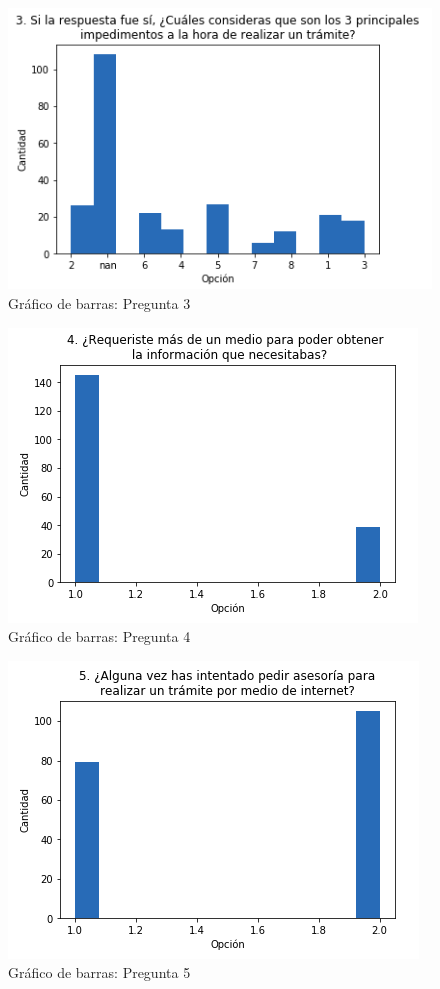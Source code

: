            \begin{figure}[H]
                \centering
                \includegraphics[width=.8\linewidth]{Latex/Classes/Imagenes/3.png}
                \caption{Gráfico de barras: Pregunta 3}
            \end{figure}
            \begin{figure}[H]
                \centering
                \includegraphics[width=.8\linewidth]{Latex/Classes/Imagenes/4.png}
                \caption{Gráfico de barras: Pregunta 4}
            \end{figure}
            \begin{figure}[H]
                \centering
                \includegraphics[width=.8\linewidth]{Latex/Classes/Imagenes/5.png}
                \caption{Gráfico de barras: Pregunta 5}
            \end{figure}
